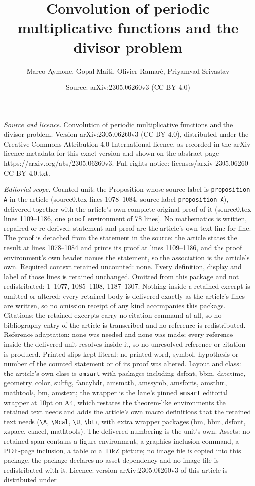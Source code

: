 \documentclass[10pt,a4paper]{amsart}
\title[Convolution of periodic multiplicative functions and the div]{Convolution of periodic multiplicative functions and the divisor problem}
\author{Marco Aymone, Gopal Maiti, Olivier Ramar\'e, Priyamvad Srivastav}
\date{Source: arXiv:2305.06260v3 (CC BY 4.0)}
\begin{document}
\maketitle

\noindent\emph{Source and licence.} Convolution of periodic multiplicative functions and the divisor problem. Version arXiv:2305.06260v3 (CC BY 4.0), distributed under the Creative Commons Attribution 4.0 International licence, as recorded in the arXiv licence metadata for this exact version and shown on the abstract page https://arxiv.org/abs/2305.06260v3. Full rights notice: licenses/arxiv-2305.06260-CC-BY-4.0.txt.\par\smallskip

\noindent\textit{Editorial scope.} Counted unit: the Proposition whose source label is \texttt{proposition A} in the article (source0.tex lines 1078--1084, source label \texttt{proposition A}), delivered together with the article's own complete original proof of it (source0.tex lines 1109--1186, one \texttt{proof} environment of 78 lines). No mathematics is written, repaired or re-derived: statement and proof are the article's own text line for line. The proof is detached from the statement in the source: the article states the result at lines 1078--1084 and prints its proof at lines 1109--1186, and the proof environment's own header names the statement, so the association is the article's own. Required context retained uncounted: none. Every definition, display and label of those lines is retained unchanged. Omitted from this package and not redistributed: 1--1077, 1085--1108, 1187--1307. Nothing inside a retained excerpt is omitted or altered: every retained body is delivered exactly as the article's lines are written, so no omission receipt of any kind accompanies this package. Citations: the retained excerpts carry no citation command at all, so no bibliography entry of the article is transcribed and no reference is redistributed. Reference adaptation: none was needed and none was made; every reference inside the delivered unit resolves inside it, so no unresolved reference or citation is produced. Printed slips kept literal: no printed word, symbol, hypothesis or number of the counted statement or of its proof was altered. Layout and class: the article's own class is \texttt{amsart} with packages including dsfont, bbm, datetime, geometry, color, subfig, fancyhdr, amsmath, amssymb, amsfonts, amsthm, mathtools, bm, amstext; the wrapper is the lane's pinned \texttt{amsart} editorial wrapper at 10pt on A4, which restates the theorem-like environments the retained text needs and adds the article's own macro definitions that the retained text needs (\texttt{\textbackslash A}, \texttt{\textbackslash Mcal}, \texttt{\textbackslash U}, \texttt{\textbackslash bt}), with extra wrapper packages (bm, bbm, dsfont, xspace, cancel, mathtools). The delivered numbering is the unit's own. Assets: no retained span contains a figure environment, a graphics-inclusion command, a PDF-page inclusion, a table or a TikZ picture; no image file is copied into this package, the package declares no asset dependency and no image file is redistributed with it. Licence: version arXiv:2305.06260v3 of this article is distributed under 
\end{document}
